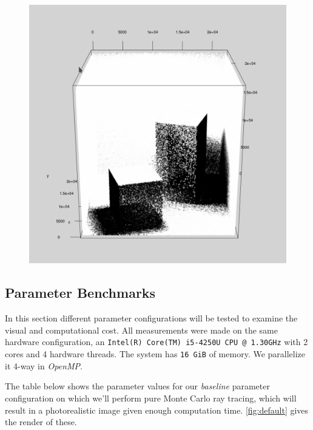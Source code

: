 \documentclass[a4paper, twocolumn]{article}
\begin{document}
            \begin{figure}[H]
                \centering
                \includegraphics[width=0.8\linewidth]{share/photon_map.png}
                \label{fig:photon_map}
            \end{figure}

        \subsection*{Parameter Benchmarks}

        In this section different parameter configurations will be tested to examine the visual and computational cost. All measurements were made on the same hardware configuration, an \texttt{Intel(R) Core(TM) i5-4250U CPU @ 1.30GHz} with 2 cores and 4 hardware threads. The system has \texttt{16 GiB} of memory. We parallelize it 4-way in \emph{OpenMP}.

            The table below shows the parameter values for our \textit{baseline} parameter configuration on which we'll perform pure Monte Carlo ray tracing, which will result in a photorealistic image given enough computation time. \cref{fig:default} gives the render of these.
\end{document}
